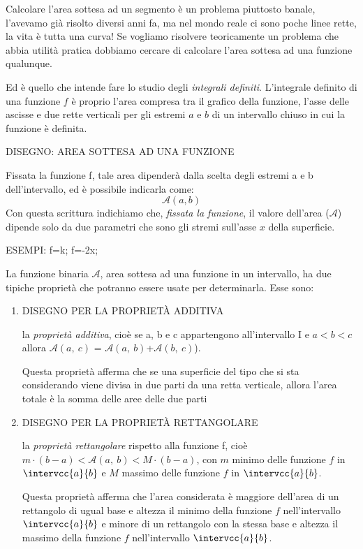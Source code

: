 Calcolare l'area sottesa ad un segmento è un problema piuttosto banale, 
l'avevamo già risolto diversi anni fa, ma nel mondo reale ci sono poche 
linee rette, la vita è tutta una curva!
Se vogliamo risolvere teoricamente un problema che abbia utilità pratica 
dobbiamo cercare di calcolare l'area sottesa ad una funzione qualunque.

Ed è quello che intende fare lo studio degli \emph{integrali definiti}.
L'integrale definito di una funzione \(f\) è proprio
l'area compresa tra il grafico della funzione, l'asse delle ascisse 
e due rette verticali per gli estremi \(a\) e \(b\) di un intervallo chiuso 
in cui la funzione è definita.

DISEGNO: AREA SOTTESA AD UNA FUNZIONE %

Fissata la funzione f, tale area dipenderà dalla scelta degli estremi a e b 
dell'intervallo, ed è possibile indicarla come: 
\[\mathcal{A}(a,b)\]
Con questa scrittura indichiamo che, \emph{fissata la funzione}, il valore 
dell'area (\(\mathcal{A}\)) dipende solo da due parametri che sono gli 
stremi sull'asse \(x\) della superficie.


ESEMPI: f=k; f=-2x; %

La funzione binaria \(\mathcal{A}\), area sottesa ad una funzione in un 
intervallo, ha due tipiche proprietà che potranno essere usate per 
determinarla. Esse sono: 

\begin{enumerate}
 \item 
DISEGNO PER LA PROPRIETÀ ADDITIVA %

la \emph{proprietà additiva}, cioè se a, b e c 
appartengono all'intervallo I e 
\(a < b < c\)
allora \(\mathcal{A}(a,~c)\) = 
\(\mathcal{A}(a,~b)\)+\(\mathcal{A}(b,~c)\)).

Questa proprietà afferma che se una superficie 
del tipo che si sta considerando viene divisa in due parti da una retta 
verticale, allora l'area totale è la somma delle aree delle due parti

 \item  
DISEGNO PER LA PROPRIETÀ RETTANGOLARE %

la \emph{proprietà rettangolare} rispetto alla funzione f, 
cioè \(m\cdot(b-a) < \mathcal{A}(a,~b)< M\cdot(b-a)\), 
con \(m\) minimo delle funzione \(f\) in \(\intervcc{a}{b}\) e \(M\) massimo 
delle funzione \(f\) in \(\intervcc{a}{b}\).

Questa proprietà afferma che l'area considerata è maggiore dell'area di un 
rettangolo di ugual base e altezza il minimo della funzione \(f\) 
nell'intervallo \(\intervcc{a}{b}\) 
e minore di un rettangolo con la stessa base e altezza il massimo della 
funzione \(f\) nell'intervallo \(\intervcc{a}{b}\). 
\end{enumerate}

